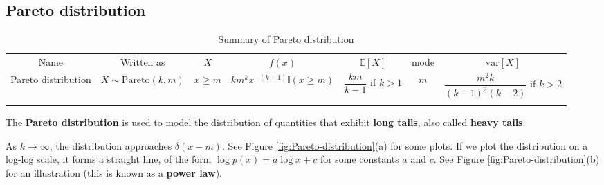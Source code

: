 \documentclass[graybox, envcountchap, twocolumn]{styles/svmult}
\begin{document}
\subsection{Pareto distribution}

\begin{table}
\caption{Summary of Pareto distribution}
\centering
\begin{tabular}{ccccccc}
\hline\noalign{\smallskip}
Name & Written as & $X$ & $f(x)$ & $\mathbb{E}[X]$ & mode & $\text{var}[X]$ \\
\noalign{\smallskip}\svhline\noalign{\smallskip}
Pareto distribution & $X \sim \text{Pareto}(k,m)$ & $x \geq m$ & $km^kx^{-(k+1)}\mathbb{I}(x \geq m)$ & $\dfrac{km}{k-1} \text{ if } k > 1$ & $m$ & $\dfrac{m^2k}{(k-1)^2(k-2)} \text{ if } k>2$ \\
\noalign{\smallskip}\hline
\end{tabular}
\end{table} 

The \textbf{Pareto distribution} is used to model the distribution of quantities that exhibit \textbf{long tails}, also called \textbf{heavy tails}.

As $k \rightarrow \infty$, the distribution approaches $\delta(x-m)$. See Figure \ref{fig:Pareto-distribution}(a) for some plots. If we plot the distribution on a log-log scale, it forms a straight line, of the form $\log p(x)=a\log x+c$ for some constants $a$ and $c$. See Figure \ref{fig:Pareto-distribution}(b) for an illustration (this is known as a \textbf{power law}).
\end{document}
